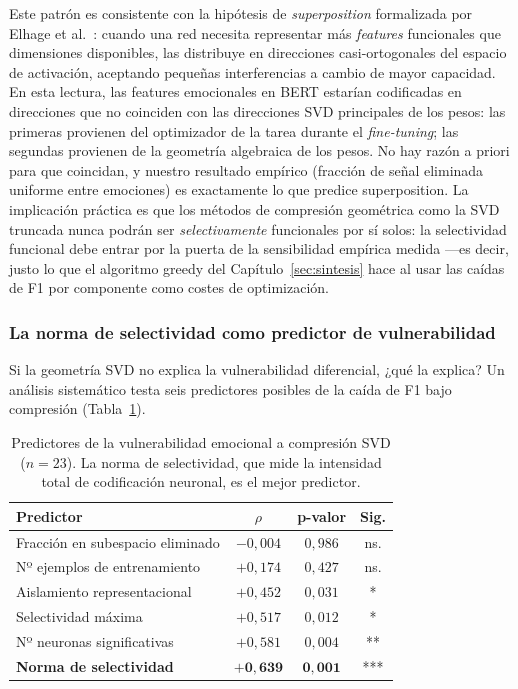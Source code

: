 Este patrón es consistente con la hipótesis de \emph{superposition}
formalizada por Elhage et al.~\cite{elhage2022toy}: cuando una red
necesita representar más \emph{features} funcionales que dimensiones
disponibles, las distribuye en direcciones casi-ortogonales del
espacio de activación, aceptando pequeñas interferencias a cambio de
mayor capacidad. En esta lectura, las features emocionales en BERT
estarían codificadas en direcciones que no coinciden con las
direcciones SVD principales de los pesos: las primeras provienen del
optimizador de la tarea durante el \emph{fine-tuning}; las segundas
provienen de la geometría algebraica de los pesos. No hay razón a
priori para que coincidan, y nuestro resultado empírico (fracción de
señal eliminada uniforme entre emociones) es exactamente lo que
predice superposition. La implicación práctica es que los métodos de
compresión geométrica como la SVD truncada nunca podrán ser
\emph{selectivamente} funcionales por sí solos: la selectividad
funcional debe entrar por la puerta de la sensibilidad empírica
medida ---es decir, justo lo que el algoritmo greedy del
Capítulo~\ref{sec:sintesis} hace al usar las caídas de F1 por
componente como costes de optimización.

\subsubsection{La norma de selectividad como predictor de vulnerabilidad}

Si la geometría SVD no explica la vulnerabilidad diferencial, ¿qué la
explica? Un análisis sistemático testa seis predictores posibles de
la caída de F1 bajo compresión
(Tabla~\ref{tab:neuron-predictores}).

\begin{table}[ht]
\centering
\caption{Predictores de la vulnerabilidad emocional a compresión SVD
($n = 23$). La norma de selectividad, que mide la intensidad total
de codificación neuronal, es el mejor predictor.}
\label{tab:neuron-predictores}
\begin{tabular}{lccc}
\toprule
\textbf{Predictor} & $\rho$ & \textbf{p-valor} & \textbf{Sig.} \\
\midrule
Fracción en subespacio eliminado & $-0{,}004$ & $0{,}986$ & ns. \\
Nº ejemplos de entrenamiento     & $+0{,}174$ & $0{,}427$ & ns. \\
Aislamiento representacional     & $+0{,}452$ & $0{,}031$ & * \\
Selectividad máxima              & $+0{,}517$ & $0{,}012$ & * \\
Nº neuronas significativas       & $+0{,}581$ & $0{,}004$ & ** \\
\textbf{Norma de selectividad}   & $\mathbf{+0{,}639}$ & $\mathbf{0{,}001}$ & *** \\
\bottomrule
\end{tabular}
\end{table}

